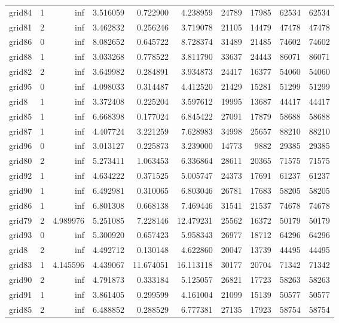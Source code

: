 \begin{longtable}{|l|r|r|r|r|r|r|r|r|r|}
grid84 & 1 & inf & 3.516059 & 0.722900 & 4.238959 & 24789 & 17985 & 62534 & 62534 \\
grid81 & 2 & inf & 3.462832 & 0.256246 & 3.719078 & 21105 & 14479 & 47478 & 47478 \\
grid86 & 0 & inf & 8.082652 & 0.645722 & 8.728374 & 31489 & 21485 & 74602 & 74602 \\
grid88 & 1 & inf & 3.033268 & 0.778522 & 3.811790 & 33637 & 24443 & 86071 & 86071 \\
grid82 & 2 & inf & 3.649982 & 0.284891 & 3.934873 & 24417 & 16377 & 54060 & 54060 \\
grid95 & 0 & inf & 4.098033 & 0.314487 & 4.412520 & 21429 & 15281 & 51299 & 51299 \\
grid8 & 1 & inf & 3.372408 & 0.225204 & 3.597612 & 19995 & 13687 & 44417 & 44417 \\
grid85 & 1 & inf & 6.668398 & 0.177024 & 6.845422 & 27091 & 17879 & 58688 & 58688 \\
grid87 & 1 & inf & 4.407724 & 3.221259 & 7.628983 & 34998 & 25657 & 88210 & 88210 \\
grid96 & 0 & inf & 3.013127 & 0.225873 & 3.239000 & 14773 & 9882 & 29385 & 29385 \\
grid80 & 2 & inf & 5.273411 & 1.063453 & 6.336864 & 28611 & 20365 & 71575 & 71575 \\
grid92 & 1 & inf & 4.634222 & 0.371525 & 5.005747 & 24373 & 17691 & 61237 & 61237 \\
grid90 & 1 & inf & 6.492981 & 0.310065 & 6.803046 & 26781 & 17683 & 58205 & 58205 \\
grid86 & 1 & inf & 6.801308 & 0.668138 & 7.469446 & 31541 & 21537 & 74678 & 74678 \\
grid79 & 2 & 4.989976 & 5.251085 & 7.228146 & 12.479231 & 25562 & 16372 & 50179 & 50179 \\
grid93 & 0 & inf & 5.300920 & 0.657423 & 5.958343 & 26977 & 18712 & 64296 & 64296 \\
grid8 & 2 & inf & 4.492712 & 0.130148 & 4.622860 & 20047 & 13739 & 44495 & 44495 \\
grid83 & 1 & 4.145596 & 4.439067 & 11.674051 & 16.113118 & 30177 & 20704 & 71342 & 71342 \\
grid90 & 2 & inf & 4.791873 & 0.333184 & 5.125057 & 26821 & 17723 & 58263 & 58263 \\
grid91 & 1 & inf & 3.861405 & 0.299599 & 4.161004 & 21099 & 15139 & 50577 & 50577 \\
grid85 & 2 & inf & 6.488852 & 0.288529 & 6.777381 & 27135 & 17923 & 58754 & 58754 \\

\end{longtable}
